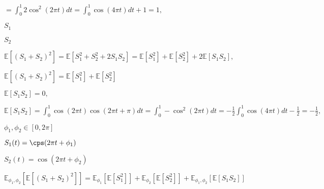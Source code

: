 \documentclass{article}
\def\lthtmlcheckvsize{\ifdim\ht\sizebox<\vsize 
  \ifdim\wd\sizebox<\hsize\expandafter\hfill\fi \expandafter\vfill
  \else\expandafter\vss\fi}%
\begin{document}
{\newpage\clearpage
{}%
$\displaystyle = \int_0^1 2 \cos^2(2 \pi t)  dt= \int_0^1 \cos(4 \pi t)dt + 1 = 1,$%
\lthtmlindisplaymathZ
\lthtmlcheckvsize\clearpage}

{\newpage\clearpage
{}%
$ S_1$%
\lthtmlindisplaymathZ
\lthtmlcheckvsize\clearpage}

{\newpage\clearpage
{}%
$ S_2$%
\lthtmlindisplaymathZ
\lthtmlcheckvsize\clearpage}

{\newpage\clearpage
{}%
$\displaystyle \mathbb{E}[(S_1 + S_2)^2] = \mathbb{E}[S_1^2 + S_2^2 + 2 S_1 S_2]= \mathbb{E}[S_1^2] + \mathbb{E}[S_2^2] + 2 \mathbb{E}[S_1 S_2],$%
\lthtmlindisplaymathZ
\lthtmlcheckvsize\clearpage}

{\newpage\clearpage
{}%
$ \mathbb{E}[(S_1 + S_2)^2] = \mathbb{E}[S_1^2] + \mathbb{E}[S_2^2] $%
\lthtmlindisplaymathZ
\lthtmlcheckvsize\clearpage}

{\newpage\clearpage
{}%
$ \mathbb{E}[S_1 S_2] = 0,$%
\lthtmlindisplaymathZ
\lthtmlcheckvsize\clearpage}

{\newpage\clearpage
{}%
$\displaystyle \mathbb{E}[S_1S_2] = \int_0^1 \cos(2 \pi t) \cos(2 \pi t + \pi) dt =\int_0^1 -\cos^2(2 \pi t )dt = - \frac{1}{2}\int_0^1 \cos(4 \pi t)dt - \frac{1}{2} = - \frac{1}{2},
$%
\lthtmlindisplaymathZ
\lthtmlcheckvsize\clearpage}

{\newpage\clearpage
{}%
$ \phi_1,\phi_2 \in [0,2 \pi]$%
\lthtmlindisplaymathZ
\lthtmlcheckvsize\clearpage}

{\newpage\clearpage
{}%
$ S_1(t) = \cps(2 \pi t + \phi_1)$%
\lthtmlindisplaymathZ
\lthtmlcheckvsize\clearpage}

{\newpage\clearpage
{}%
$ S_2(t) = \cos(2 \pi t + \phi_2)$%
\lthtmlindisplaymathZ
\lthtmlcheckvsize\clearpage}

{\newpage\clearpage
{}%
$\displaystyle \mathbb{E}_{\phi_1,\phi_2} \left[\mathbb{E}[(S_1 + S_2)^2]\right] = \mathbb{E}_{\phi_1} \left[\mathbb{E}\left[ S_1^2\right]\right] + \mathbb{E}_{\phi_2} \left[\mathbb{E}\left[ S_2^2\right]\right] +\mathbb{E}_{\phi_1,\phi_2} \left[\mathbb{E}\left[ S_1S_2\right]\right]$%
\lthtmlindisplaymathZ
\lthtmlcheckvsize\clearpage}
\end{document}
